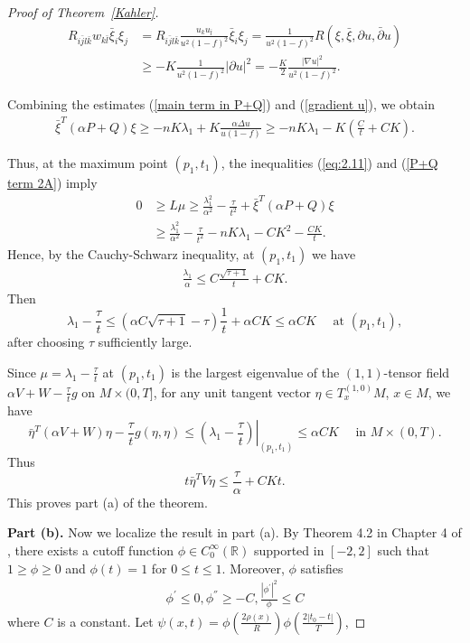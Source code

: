 \documentclass{amsart}
\theoremstyle{definition}
\theoremstyle{remark}
\numberwithin{equation}{section}
\begin{document}
\begin{proof}[Proof of Theorem~\ref{Kahler}]
\begin{align}
R_{i\bar{j}l\bar{k}}w_{k\bar{l}}\bar{\xi}_{i}\xi_{j}&
=R_{i\bar{j}l\bar{k}}\frac{u_{k}u_{\bar{l}}}{u^{2}(1-f)^{2}}\bar{\xi}_{i}\xi_{j}
=\frac{1}{u^{2}(1-f)^{2}}R(\xi,\bar{\xi},\partial u,\bar{\partial} u)\nonumber\\
&\label{gradient u}\geq -K\frac{1}{u^{2}(1-f)^{2}}|\partial u|^{2}
=-\frac{K}{2}\frac{|\nabla u|^{2}}{u^{2}(1-f)^{2}}.
\end{align}

Combining the estimates (\ref{main term in P+Q}) and (\ref{gradient u}), we obtain 
 \begin{align}\label{P+Q term 2A}
\bar{\xi}^{T}(\alpha P+Q)\xi\geq -nK\lambda_{1}+K\frac{\alpha \Delta u}{u(1-f)}\geq -nK\lambda_{1}-K(\frac{C}{t}+CK).
 \end{align}



Thus, at the maximum point $(p_{1},t_{1})$, the inequalities (\ref{eq:2.11}) and (\ref{P+Q term 2A}) imply
\begin{align}
0&\geq L\mu\geq \frac{\lambda_1^{2}}{\alpha^{2}}-\frac{\tau}{t^{2}}
+\bar{\xi}^{T}(\alpha P+Q)\xi\\
&\geq \frac{\lambda_1^{2}}{\alpha^{2}}-\frac{\tau}{t^{2}}-nK\lambda_1-CK^2-\frac{CK}{t}.
\end{align}
Hence, by the Cauchy-Schwarz inequality, at $(p_{1},t_{1})$ we have 
\begin{align*}
\frac{\lambda_1}{\alpha}\leq C\frac{\sqrt{\tau+1}}{t}+CK.
\end{align*}
 Then
\[
\lambda_1-\frac{\tau}{t} \leq(\alpha C\sqrt{\tau+1}-\tau) \frac{1}{t}+\alpha CK \leq \alpha CK \quad \text { at }\left(p_1, t_1\right),
\]
after choosing $\tau$ sufficiently large.

Since $\mu=\lambda_1-\frac{\tau}{t}$ at $\left(p_1, t_1\right)$ is the largest eigenvalue of the $(1,1)$-tensor field $\alpha V+W-\frac{\tau}{t} g$ on $M \times(0, T]$, for any unit tangent vector $\eta \in T_x^{(1,0)} M$, $x \in M$, we have
\[
  \bar{\eta}^T(\alpha V+W) \eta-\frac{\tau}{t} g(\eta, \eta) \leq\left.\left(\lambda_1-\frac{\tau}{t}\right)\right|_{\left(p_1, t_1\right)} \leq \alpha CK \quad \text { in } M \times(0, T) .
\]
Thus
\[
t \bar{\eta}^T V \eta \leq \frac{\tau}{\alpha}+CK t.
\]
This proves part (a) of the theorem.


\textbf{Part (b).} Now we localize the result in part (a). 
By Theorem 4.2 in Chapter 4 of \cite{S-Y}, there exists a cutoff function $\phi\in C_{0}^{\infty}(\mathbb{R})$ supported in $[-2,2]$ such that $1\geq \phi\geq 0$ and $\phi(t)=1$ for $0\leq t\leq 1$. Moreover, $\phi$ satisfies 
\begin{align}
\phi^{'}\leq 0, \phi^{''}\geq -C, \frac{|\phi^{'}|^{2}}{\phi}\leq C
\end{align}
where $C$ is a constant.
Let 
\label{def psi}
$\psi(x,t)=\phi(\frac{2\rho(x)}{R})\phi(\frac{2|t_{0}-t|}{T})$,


\end{proof}
\end{document}
